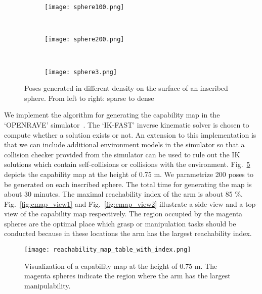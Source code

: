 \begin{figure}[!htbp]
    \centering
    \begin{subfigure}[b]{0.25\textwidth}
        \texttt{[image: sphere100.png]}
        \caption{}
        \label{fig:sphere1}
    \end{subfigure}
    ~ %
    \begin{subfigure}[b]{0.25\textwidth}
        \texttt{[image: sphere200.png]}
        \caption{}
        \label{fig:sphere2}
    \end{subfigure}
    ~ %
    \begin{subfigure}[b]{0.25\textwidth}
        \texttt{[image: sphere3.png]}
        \caption{}
        \label{fig:sphere3}
    \end{subfigure}
    \caption{Poses generated in different density on the surface of an inscribed sphere. From left to right: sparse to dense}\label{fig:inscribed_sphere}
\end{figure}

We implement the algorithm for generating the capability map in the `OPENRAVE' simulator~\cite{Diankov2008}. The `IK-FAST' inverse kinematic solver is chosen to compute  whether a solution exists or not. An extension to this implementation is that we can include additional environment models in the simulator so that a collision checker provided from the simulator can be used to rule out the IK solutions which contain self-collisions or collisions with the environment. Fig.~\ref{fig:cmap} depicts the capability map at the height of 0.75 m. We parametrize 200 poses to be generated on each inscribed sphere. The total time for generating the map is about 30 minutes. The maximal reachability index of the arm is about 85 \%. Fig.~\ref{fig:cmap_view1} and Fig.~\ref{fig:cmap_view2} illustrate a side-view and a top-view of the capability map respectively. The region occupied by the magenta spheres are the optimal place which grasp or manipulation tasks should be conducted  because in these locations the arm has the largest reachability index. 

\begin{figure}[!htbp]
\centering
\texttt{[image: reachability\_map\_table\_with\_index.png]}
\captionsetup{justification=raggedright}
\caption{Visualization of a capability map at the height  of 0.75 m. The magenta spheres indicate the region where the arm has the largest manipulability.}
\label{fig:cmap}       %
\end{figure} 

